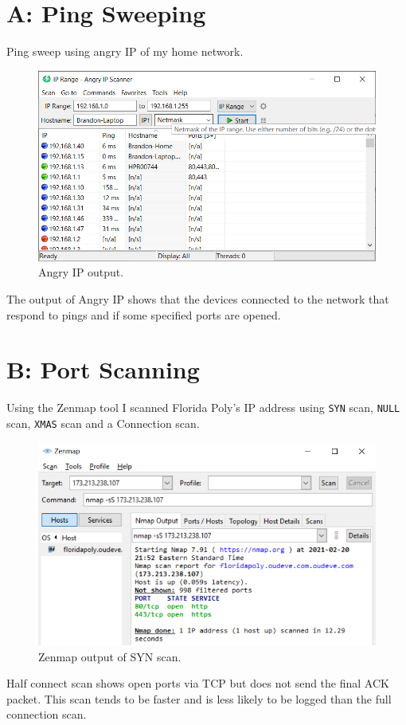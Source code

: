 \section*{A: Ping Sweeping}
Ping sweep using angry IP of my home network.\\
\begin{figure}[H]
    \centering
    \includegraphics[width=\linewidth]{figures/a1.png}
    \caption{Angry IP output.}
\end{figure}
The output of Angry IP shows that the devices connected to the network that respond to pings and if some specified ports are opened.

\section*{B: Port Scanning}
Using the Zenmap tool I scanned Florida Poly's IP address using \verb|SYN| scan, \verb|NULL| scan, \verb|XMAS| scan and a Connection scan.

\begin{figure}[H]
    \centering
    \includegraphics[width=\linewidth]{figures/b1.png}
    \caption{Zenmap output of SYN scan.}
\end{figure}
Half connect scan shows open ports via TCP but does not send the final ACK packet.
This scan tends to be faster and is less likely to be logged than the full connection scan.

